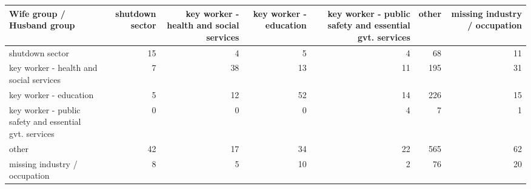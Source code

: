 
\begin{tabular}{lrrrrrr}
\toprule
Wife group / Husband group & shutdown sector & key worker - health
 and social services & key worker - education & key worker - public safety
 and essential gvt. services & other & missing industry / occupation\\
\midrule
shutdown sector & 15 & 4 & 5 & 4 & 68 & 11\\
key worker - health
 and social services & 7 & 38 & 13 & 11 & 195 & 31\\
key worker - education & 5 & 12 & 52 & 14 & 226 & 15\\
key worker - public safety
 and essential gvt. services & 0 & 0 & 0 & 4 & 7 & 1\\
other & 42 & 17 & 34 & 22 & 565 & 62\\
missing industry / occupation & 8 & 5 & 10 & 2 & 76 & 20\\
\bottomrule
\end{tabular}
